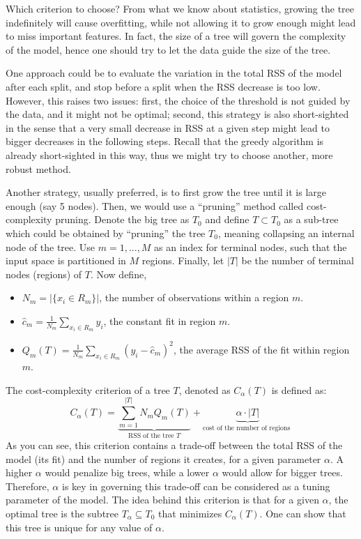 \documentclass[12pt]{report}
\begin{document}
Which criterion to choose? From what we know about statistics, growing the tree indefinitely will cause overfitting, while not allowing it to grow enough might lead to miss important features. In fact, the size of a tree will govern the complexity of the model, hence one should try to let the data guide the size of the tree.

One approach could be to evaluate the variation in the total RSS of the model after each split, and stop before a split when the RSS decrease is too low. However, this raises two issues: first, the choice of the threshold is not guided by the data, and it might not be optimal; second, this strategy is also short-sighted in the sense that a very small decrease in RSS at a given step might lead to bigger decreases in the following steps. Recall that the greedy algorithm is already short-sighted in this way, thus we might try to choose another, more robust method.

Another strategy, usually preferred, is to first grow the tree until it is large enough (say 5 nodes). Then, we would use a ``pruning'' method called cost-complexity pruning. Denote the big tree as $T_0$ and define $T\subset T_0$ as a sub-tree which could be obtained by ``pruning'' the tree $T_0$, meaning collapsing an internal node of the tree. Use $m = 1,...,M$ as an index for terminal nodes, such that the input space is partitioned in $M$ regions. Finally, let $\lvert T\rvert$ be the number of terminal nodes (regions) of $T$. Now define,\begin{itemize}
\item $N_m = \lvert\{x_i\in R_m\}\rvert$, the number of observations within a region $m$.
\item $\hat c_m = \frac{1}{N_m}\sum_{x_i\in R_m} y_i $, the constant fit in region $m$.
\item $ Q_m(T) = \frac{1}{N_m}\sum_{x_i\in R_m} (y_i - \hat c_m)^2$, the average RSS of the fit within region $m$.
\end{itemize}

The cost-complexity criterion of a tree $T$, denoted as $C_\alpha(T)$ is defined as: $$C_\alpha(T) = \underbrace{\sum_{m=1}^{\lvert T\rvert} N_m Q_m(T)}_{\text{RSS of the tree }T} + \underbrace{\alpha\cdot \lvert T\rvert}_{\text{cost of the number of regions }} $$ As you can see, this criterion contains a trade-off between the total RSS of the model (its fit) and the number of regions it creates, for a given parameter $\alpha$. A higher $\alpha$ would penalize big trees, while a lower $\alpha$ would allow for bigger trees. Therefore, $\alpha$ is key in governing this trade-off can be considered as a tuning parameter of the model. The idea behind this criterion is that for a given $\alpha$, the optimal tree is the subtree $T_\alpha\subseteq T_0$ that minimizes $C_\alpha(T)$. One can show that this tree is unique for any value of $\alpha$.
\end{document}
